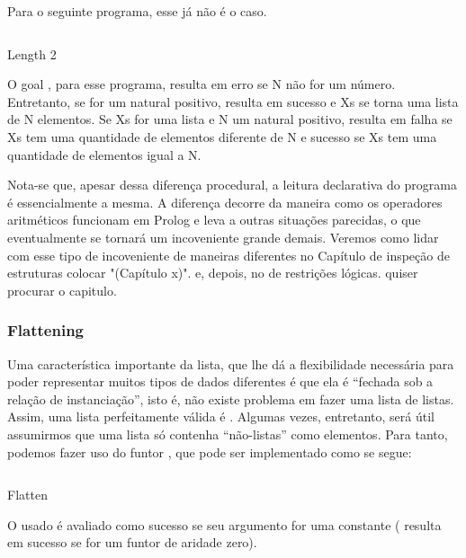 Para o seguinte programa, esse já não é o caso.

    \begin{listing}
\inputminted{prolog}{../Exemplos/Cap3/prog3_length2.pl}
\caption{Length 2}\label{lst:length2}
    \end{listing}

O goal , para esse programa, resulta em erro se
N não for um número. Entretanto, se for um natural positivo,
 resulta em sucesso e Xs se torna uma lista de
N elementos. Se Xs for uma lista e N um natural positivo,
 resulta em falha se Xs tem uma quantidade de
elementos diferente de N e sucesso se Xs tem uma quantidade de
elementos igual a N.

Nota-se que, apesar dessa diferença procedural, a leitura declarativa
do programa é essencialmente a mesma. A diferença decorre da maneira
como os operadores aritméticos funcionam em Prolog e leva a outras
situações parecidas, o que eventualmente se tornará um incoveniente
grande demais. Veremos como lidar com esse tipo de incoveniente de
maneiras diferentes no Capítulo de inspeção de estruturas %
colocar "(Capítulo x)".  e, depois, no de restrições
lógicas. %
quiser procurar o capitulo.

\subsubsection{Flattening}

Uma característica importante da lista, que lhe dá a flexibilidade
necessária para poder representar muitos tipos de dados diferentes é
que ela é ``fechada sob a relação de instanciação'', isto é, não
existe problema em fazer uma lista de listas. Assim, uma lista
perfeitamente válida é \codigo{[[[a,b],c],[]]}. Algumas vezes,
entretanto, será útil assumirmos que uma lista  só contenha
``não-listas'' como elementos. Para tanto, podemos fazer uso do funtor
, que pode ser implementado como se segue:

    \begin{listing}
\inputminted{prolog}{../Exemplos/Cap3/prog3_flatten.pl}
\caption{Flatten}\label{lst:flatten}
    \end{listing}

\noindent O  usado é avaliado como sucesso se seu
argumento for uma constante ( resulta em sucesso se
 for um funtor de aridade zero).


